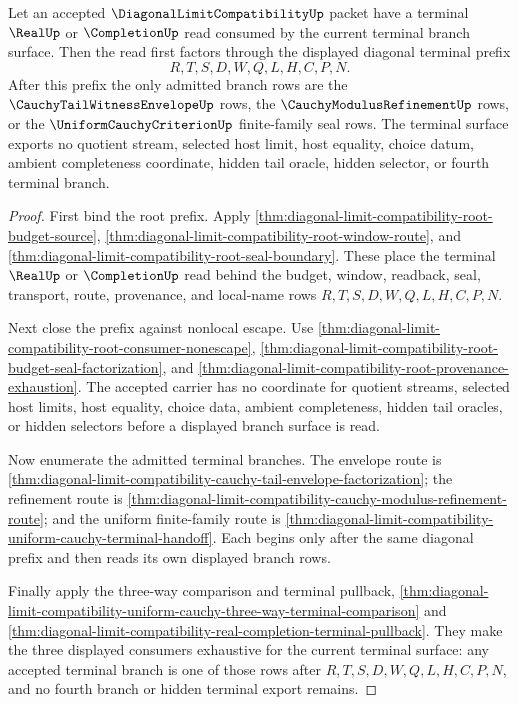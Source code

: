 \begin{theorem}
\label{thm:diagonal-limit-compatibility-terminal-branch-exhaustion}
Let an accepted $\DiagonalLimitCompatibilityUp$ packet have a terminal
$\RealUp$ or $\CompletionUp$ read consumed by the current terminal branch
surface. Then the read first factors through the displayed diagonal terminal
prefix
$$
R,T,S,D,W,Q,L,H,C,P,N.
$$
After this prefix the only admitted branch rows are the
$\CauchyTailWitnessEnvelopeUp$ rows, the $\CauchyModulusRefinementUp$ rows, or
the $\UniformCauchyCriterionUp$ finite-family seal rows. The terminal surface
exports no quotient stream, selected host limit, host equality, choice datum,
ambient completeness coordinate, hidden tail oracle, hidden selector, or fourth
terminal branch.
\end{theorem}
\begin{proof}
First bind the root prefix. Apply
\autoref{thm:diagonal-limit-compatibility-root-budget-source},
\autoref{thm:diagonal-limit-compatibility-root-window-route}, and
\autoref{thm:diagonal-limit-compatibility-root-seal-boundary}. These place the
terminal $\RealUp$ or $\CompletionUp$ read behind the budget, window, readback,
seal, transport, route, provenance, and local-name rows
$R,T,S,D,W,Q,L,H,C,P,N$.

Next close the prefix against nonlocal escape. Use
\autoref{thm:diagonal-limit-compatibility-root-consumer-nonescape},
\autoref{thm:diagonal-limit-compatibility-root-budget-seal-factorization}, and
\autoref{thm:diagonal-limit-compatibility-root-provenance-exhaustion}. The
accepted carrier has no coordinate for quotient streams, selected host limits,
host equality, choice data, ambient completeness, hidden tail oracles, or hidden
selectors before a displayed branch surface is read.

Now enumerate the admitted terminal branches. The envelope route is
\autoref{thm:diagonal-limit-compatibility-cauchy-tail-envelope-factorization};
the refinement route is
\autoref{thm:diagonal-limit-compatibility-cauchy-modulus-refinement-route}; and
the uniform finite-family route is
\autoref{thm:diagonal-limit-compatibility-uniform-cauchy-terminal-handoff}.
Each begins only after the same diagonal prefix and then reads its own displayed
branch rows.

Finally apply the three-way comparison and terminal pullback,
\autoref{thm:diagonal-limit-compatibility-uniform-cauchy-three-way-terminal-comparison}
and
\autoref{thm:diagonal-limit-compatibility-real-completion-terminal-pullback}.
They make the three displayed consumers exhaustive for the current terminal
surface: any accepted terminal branch is one of those rows after
$R,T,S,D,W,Q,L,H,C,P,N$, and no fourth branch or hidden terminal export remains.
\end{proof}
